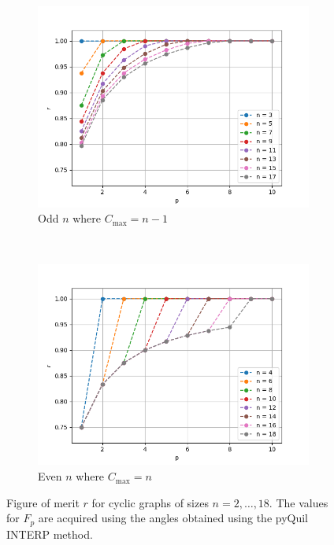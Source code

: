 \begin{figure}[H]
	\centering
	
	\begin{subfigure}[t]{0.5\textwidth}
		\centering
		\includegraphics[width=\textwidth]{figures/interp/r_cyclic_odd.png}
		\caption{Odd $n$ where $C_{\max} = n-1$}
	\end{subfigure}%
	~ 
	\begin{subfigure}[t]{0.5\textwidth}
		\centering
		\includegraphics[width=\textwidth]{figures/interp/r_cyclic_even.png}
		\caption{Even $n$ where $C_{\max} = n$}
	\end{subfigure}
	\caption{Figure of merit $r$ for cyclic graphs of sizes $n= 2, \dots , 18$. The values for $F_p$ are acquired using the angles obtained using the pyQuil INTERP method.}
	\label{fig:r-cyclic}
\end{figure}

